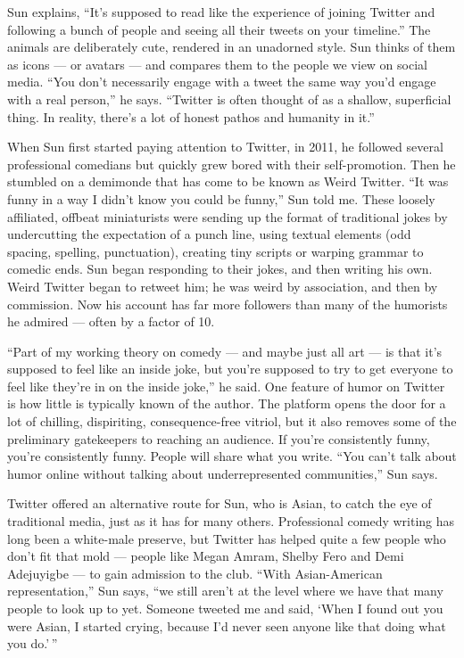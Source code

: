 Sun explains, ``It's supposed to read like the experience of joining
Twitter and following a bunch of people and seeing all their tweets on
your timeline.'' The animals are deliberately cute, rendered in an
unadorned style. Sun thinks of them as icons --- or avatars --- and
compares them to the people we view on social media. ``You don't
necessarily engage with a tweet the same way you'd engage with a real
person,'' he says. ``Twitter is often thought of as a shallow,
superficial thing. In reality, there's a lot of honest pathos and
humanity in it.''

When Sun first started paying attention to Twitter, in 2011, he followed
several professional comedians but quickly grew bored with their
self-promotion. Then he stumbled on a demimonde that has come to be
known as Weird Twitter. ``It was funny in a way I didn't know you could
be funny,'' Sun told me. These loosely affiliated, offbeat miniaturists
were sending up the format of traditional jokes by undercutting the
expectation of a punch line, using textual elements (odd spacing,
spelling, punctuation), creating tiny scripts or warping grammar to
comedic ends. Sun began responding to their jokes, and then writing his
own. Weird Twitter began to retweet him; he was weird by association,
and then by commission. Now his account has far more followers than many
of the humorists he admired --- often by a factor of 10.

``Part of my working theory on comedy --- and maybe just all art --- is
that it's supposed to feel like an inside joke, but you're supposed to
try to get everyone to feel like they're in on the inside joke,'' he
said. One feature of humor on Twitter is how little is typically known
of the author. The platform opens the door for a lot of chilling,
dispiriting, consequence-free vitriol, but it also removes some of the
preliminary gatekeepers to reaching an audience. If you're consistently
funny, you're consistently funny. People will share what you write.
``You can't talk about humor online without talking about
underrepresented communities,'' Sun says.

Twitter offered an alternative route for Sun, who is Asian, to catch the
eye of traditional media, just as it has for many others. Professional
comedy writing has long been a white-male preserve, but Twitter has
helped quite a few people who don't fit that mold --- people like Megan
Amram, Shelby Fero and Demi Adejuyigbe --- to gain admission to the
club. ``With Asian-American representation,'' Sun says, ``we still
aren't at the level where we have that many people to look up to yet.
Someone tweeted me and said, `When I found out you were Asian, I started
crying, because I'd never seen anyone like that doing what you do.' ''

